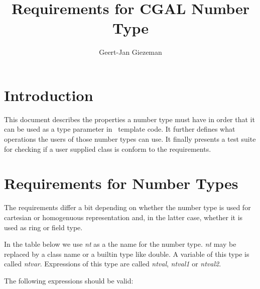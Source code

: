 \documentclass[]{article}
\begin{document}
%   
%   
%   
\title{\bf Requirements for CGAL Number Type}
\author{Geert-Jan Giezeman}
\date{}
\maketitle

\section{Introduction}

This document describes the properties a number type must have in
order that it can be used as a type parameter in \cgal\ template
code. It further defines what operations the users of those number
types can use.  It finally presents a test suite for checking if a user
supplied class is conform to the requirements.

\section{Requirements for Number Types}

The requirements differ a bit depending on whether the number type is used for
cartesian or homogenuous representation and, in the latter case, whether it is
used as ring or field type.

In the table below we use {\em nt} as a the name for the number type.
{\em nt} may be replaced by a class name or a builtin type like double.
A variable of this type is called {\em ntvar}.
Expressions of this type are called {\em ntval}, {\em ntval1} or {\em ntval2}.



The following expressions should be valid:
\end{document}
